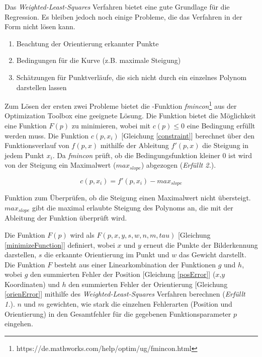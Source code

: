 Das \textit{Weighted-Least-Squares} Verfahren bietet eine gute Grundlage für die Regression. Es bleiben jedoch noch einige Probleme, die das Verfahren in der Form nicht lösen kann.
\begin{enumerate}
\item Beachtung der Orientierung erkannter Punkte
\item Bedingungen für die Kurve (z.B. maximale Steigung)
\item Schätzungen für Punktverläufe, die sich nicht durch ein einzelnes Polynom darstellen lassen
\end{enumerate}

Zum Lösen der ersten zwei Probleme bietet die \matlab -Funktion \textit{fmincon}\footnote{https://de.mathworks.com/help/optim/ug/fmincon.html} aus der Optimization Toolbox eine geeignete Lösung. Die Funktion bietet die Möglichkeit eine Funktion $F(p)$ zu minimieren, wobei mit $c(p) \leq 0$ eine Bedingung erfüllt werden muss. Die Funktion $c(p,x_i)$ [Gleichung \ref{constraint}] berechnet über den Funktionsverlauf von $f(p,x)$ mithilfe der Ableitung $f'(p,x)$ die Steigung in jedem Punkt $x_i$. Da \textit{fmincon} prüft, ob die Bedingungsfunktion kleiner 0 ist wird von der Steigung ein Maximalwert ($max_{slope}$) abgezogen (\textit{Erfüllt 2.}).\\
\begin{ownequation}[H]
\begin{equation}
c(p,x_i) = f'(p,x_i)-max_{slope}
\end{equation}
\caption[Funktion zum Überprüfen, ob die Steigung einen Maximalwert nicht übersteigt.]{Funktion zum Überprüfen, ob die Steigung einen Maximalwert nicht übersteigt. $max_{slope}$ gibt die maximal erlaubte Steigung des Polynoms an, die mit der Ableitung der Funktion überprüft wird.}
\label{constraint}
\end{ownequation}
Die Funktion $F(p)$ wird als $F(p,x,y,s,w,n,m,tau)$ [Gleichung \ref{minimizeFunction}] definiert, wobei $x$ und $y$ erneut die Punkte der Bilderkennung darstellen, $s$ die erkannte Orientierung im Punkt und $w$ das Gewicht darstellt. Die Funktion $F$ besteht aus einer Linearkombination der Funktionen $g$ und $h$, wobei $g$ den summierten Fehler der Position [Gleichung \ref{posError}] ($x$,$y$ Koordinaten) und $h$ den summierten Fehler der Orientierung [Gleichung \ref{orienError}] mithilfe des \textit{Weighted-Least-Squares} Verfahren berechnen (\textit{Erfüllt 1.}). $n$ und $m$ gewichten, wie stark die einzelnen Fehlerarten (Position und Orientierung) in den Gesamtfehler für die gegebenen Funktionsparameter $p$ eingehen.\\
